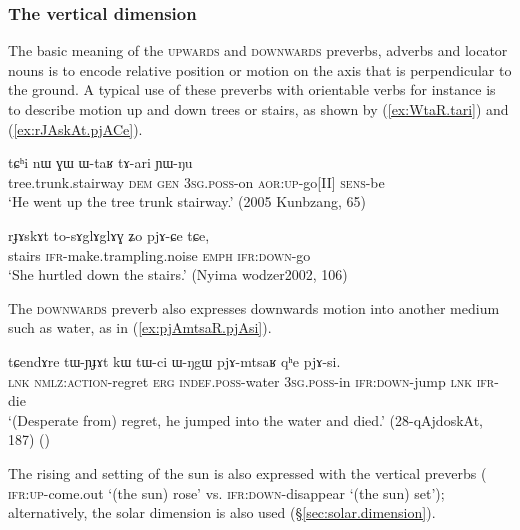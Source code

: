  
\subsubsection{The vertical dimension}  \label{sec:vertical.dimension}
The basic meaning of the \textsc{upwards}  and \textsc{downwards} preverbs, adverbs and locator nouns is to encode relative position or motion on the axis that is perpendicular to the ground. A typical use of these preverbs with orientable verbs for instance is to describe motion up and down trees or stairs, as shown by (\ref{ex:WtaR.tari}) and (\ref{ex:rJAskAt.pjACe}).

\begin{exe}
\ex \label{ex:WtaR.tari}
 \gll tɕʰi nɯ ɣɯ ɯ-taʁ tɤ-ari ɲɯ-ŋu \\
 tree.trunk.stairway \textsc{dem} \textsc{gen} \textsc{3sg}.\textsc{poss}-on \textsc{aor}:\textsc{up}-go[II] \textsc{sens}-be \\
\glt `He went up the tree trunk stairway.' (2005 Kunbzang, 65)
\end{exe}

\begin{exe}
\ex \label{ex:rJAskAt.pjACe}
 \gll  rɟɤskɤt to-sɤglɤglɤɣ ʑo pjɤ-ɕe tɕe,   \\
stairs \textsc{ifr}-make.trampling.noise \textsc{emph} \textsc{ifr}:\textsc{down}-go \\
\glt `She hurtled down the stairs.' (Nyima wodzer2002, 106)
\end{exe}

The \textsc{downwards} preverb also expresses downwards motion into another medium such as water, as in (\ref{ex:pjAmtsaR.pjAsi}).

\begin{exe}
\ex \label{ex:pjAmtsaR.pjAsi}
 \gll tɕendɤre tɯ-ɲɟɤt kɯ tɯ-ci ɯ-ŋgɯ pjɤ-mtsaʁ qʰe pjɤ-si. \\
 \textsc{lnk} \textsc{nmlz}:\textsc{action}-regret \textsc{erg} \textsc{indef}.\textsc{poss}-water \textsc{3sg}.\textsc{poss}-in \textsc{ifr}:\textsc{down}-jump \textsc{lnk} \textsc{ifr}-die \\
 \glt `(Desperate from) regret, he jumped into the water and died.' (28-qAjdoskAt, 187)
()
\end{exe}

The rising and setting of the sun is also expressed with the vertical preverbs ( \textsc{ifr}:\textsc{up}-come.out `(the sun) rose' vs.  \textsc{ifr}:\textsc{down}-disappear `(the sun) set'); alternatively, the solar dimension is also used (§\ref{sec:solar.dimension}).


